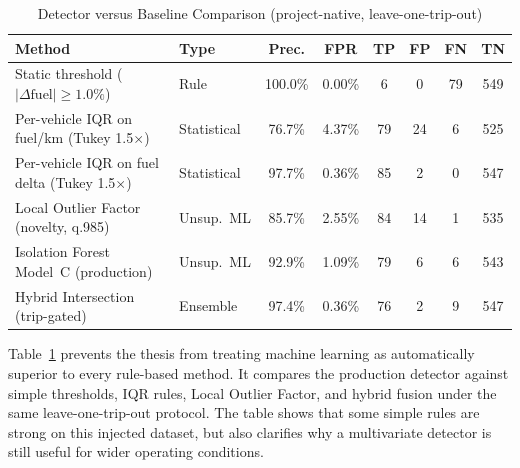 \begin{table}[!htbp]
\centering
\caption{Detector versus Baseline Comparison (project-native, leave-one-trip-out)}
\label{tab:so4_baselines}
\scriptsize
\setlength{\tabcolsep}{3pt}
\begin{tabular}{|p{}|p{}|c|c|c|c|c|c|}
\hline
\textbf{Method} & \textbf{Type} & \textbf{Prec.} & \textbf{FPR} & \textbf{TP} & \textbf{FP} & \textbf{FN} & \textbf{TN} \\
\hline
Static threshold ($|\Delta\text{fuel}| \geq 1.0\%$) & Rule & 100.0\% & 0.00\% & 6 & 0 & 79 & 549 \\
\hline
Per-vehicle IQR on fuel/km (Tukey 1.5$\times$) & Statistical & 76.7\% & 4.37\% & 79 & 24 & 6 & 525 \\
\hline
Per-vehicle IQR on fuel delta (Tukey 1.5$\times$) & Statistical & 97.7\% & 0.36\% & 85 & 2 & 0 & 547 \\
\hline
Local Outlier Factor (novelty, q.985) & Unsup.\ ML & 85.7\% & 2.55\% & 84 & 14 & 1 & 535 \\
\hline
Isolation Forest Model~C (production) & Unsup.\ ML & 92.9\% & 1.09\% & 79 & 6 & 6 & 543 \\
\hline
Hybrid Intersection (trip-gated) & Ensemble & 97.4\% & 0.36\% & 76 & 2 & 9 & 547 \\
\hline
\end{tabular}
\normalsize
\end{table}

Table~\ref{tab:so4_baselines} prevents the thesis from treating machine learning as automatically superior to every rule-based method. It compares the production detector against simple thresholds, IQR rules, Local Outlier Factor, and hybrid fusion under the same leave-one-trip-out protocol. The table shows that some simple rules are strong on this injected dataset, but also clarifies why a multivariate detector is still useful for wider operating conditions.

